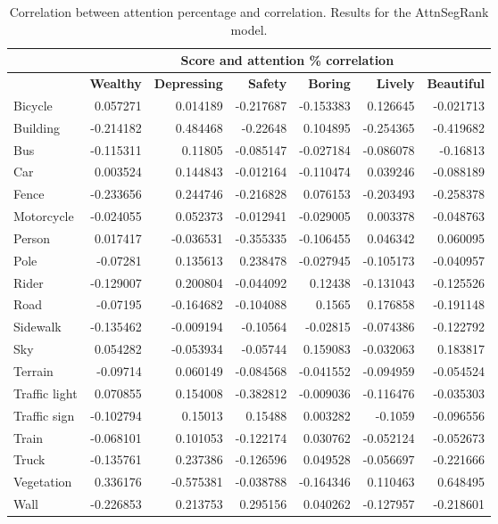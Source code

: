 \begin{table}[H]
    \begin{tabular}{|l|rrrrrr|}
    \hline
    & \multicolumn{6}{c|}{\textbf{Score and attention \% correlation}}              \\ \hline
    & \textbf{Wealthy}   & \textbf{Depressing} & \textbf{Safety}    & \textbf{Boring}    & \textbf{Lively}    & \textbf{Beautiful} \\ \hline
    Bicycle       & 0.057271  & 0.014189   & -0.217687 & -0.153383 & 0.126645  & -0.021713 \\
    Building      & -0.214182 & 0.484468   & -0.22648  & 0.104895  & -0.254365 & -0.419682 \\
    Bus           & -0.115311 & 0.11805    & -0.085147 & -0.027184 & -0.086078 & -0.16813  \\
    Car           & 0.003524  & 0.144843   & -0.012164 & -0.110474 & 0.039246  & -0.088189 \\
    Fence         & -0.233656 & 0.244746   & -0.216828 & 0.076153  & -0.203493 & -0.258378 \\
    Motorcycle    & -0.024055 & 0.052373   & -0.012941 & -0.029005 & 0.003378  & -0.048763 \\
    Person        & 0.017417  & -0.036531  & -0.355335 & -0.106455 & 0.046342  & 0.060095  \\
    Pole          & -0.07281  & 0.135613   & 0.238478  & -0.027945 & -0.105173 & -0.040957 \\
    Rider         & -0.129007 & 0.200804   & -0.044092 & 0.12438   & -0.131043 & -0.125526 \\
    Road          & -0.07195  & -0.164682  & -0.104088 & 0.1565    & 0.176858  & -0.191148 \\
    Sidewalk      & -0.135462 & -0.009194  & -0.10564  & -0.02815  & -0.074386 & -0.122792 \\
    Sky           & 0.054282  & -0.053934  & -0.05744  & 0.159083  & -0.032063 & 0.183817  \\
    Terrain       & -0.09714  & 0.060149   & -0.084568 & -0.041552 & -0.094959 & -0.054524 \\
    Traffic light & 0.070855  & 0.154008   & -0.382812 & -0.009036 & -0.116476 & -0.035303 \\
    Traffic sign  & -0.102794 & 0.15013    & 0.15488   & 0.003282  & -0.1059   & -0.096556 \\
    Train         & -0.068101 & 0.101053   & -0.122174 & 0.030762  & -0.052124 & -0.052673 \\
    Truck         & -0.135761 & 0.237386   & -0.126596 & 0.049528  & -0.056697 & -0.221666 \\
    Vegetation    & 0.336176  & -0.575381  & -0.038788 & -0.164346 & 0.110463  & 0.648495  \\
    Wall          & -0.226853 & 0.213753   & 0.295156  & 0.040262  & -0.127957 & -0.218601 \\
    \hline
    \end{tabular}
    \caption[Score and attention correlation.]{
        Correlation between attention percentage and correlation. Results for the
        AttnSegRank model.
	}
	\label{tab:seg_correlation}
\end{table}
